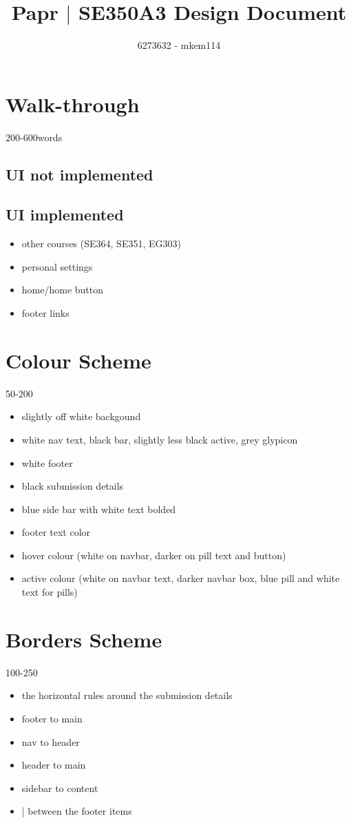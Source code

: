 \documentclass[10pt,a4paper]{article}
\author{6273632 - mkem114}
\title{Papr $|$ SE350A3 Design Document}
\begin{document}
\maketitle
\section{Walk-through}
200-600words
\subsection{UI not implemented}
\subsection{UI implemented}
\begin{itemize}
	\item other courses (SE364, SE351, EG303)
	\item personal settings
	\item home/home button
	\item footer links
\end{itemize}
\section{Colour Scheme}
50-200
\begin{itemize}
	\item slightly off white backgound
	\item white nav text, black bar, slightly less black active, grey glypicon
	\item white footer
	\item black submission details
	\item blue side bar with white text bolded
	\item footer text color
	\item hover colour (white on navbar, darker on pill text and button)
	\item active colour (white on navbar text, darker navbar box, blue pill and white text for pills)
\end{itemize}
\section{Borders Scheme}
100-250
\begin{itemize}
	\item the horizontal rules around the submission details
	\item footer to main
	\item nav to header
	\item header to main
	\item sidebar to content
	\item | between the footer items
\end{itemize}
\end{document}

